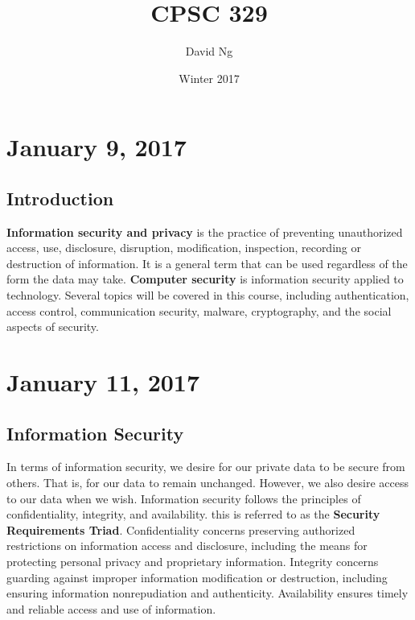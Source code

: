 \documentclass[11pt]{article}
\theoremstyle{plain} %
\theoremstyle{definition}
\theoremstyle{example}
\theoremstyle{remark}
\begin{document}
\title{CPSC 329}
\author{David Ng}
\date{Winter 2017}
\maketitle

\tableofcontents

\eject


\section{January 9, 2017}
\subsection{Introduction}

\textbf{Information security and privacy} is the practice of preventing unauthorized access, use, disclosure, disruption, modification, inspection, recording or destruction of information. It is a general term that can be used regardless of the form the data may take. \textbf{Computer security} is information security applied to technology. Several topics will be covered in this course, including authentication, access control, communication security, malware, cryptography, and the social aspects of security. 

\section{January 11, 2017}
\subsection{Information Security}

In terms of information security, we desire for our private data to be secure from others. That is, for our data to remain unchanged. However, we also desire access to our data when we wish. Information security follows the principles of confidentiality, integrity, and availability. this is referred to as the \textbf{Security Requirements Triad}. Confidentiality concerns preserving authorized restrictions on information access and disclosure, including the means for protecting personal privacy and proprietary information. Integrity concerns guarding against improper information modification or destruction, including ensuring information nonrepudiation and authenticity. Availability ensures timely and reliable access and use of information. 
\end{document}
